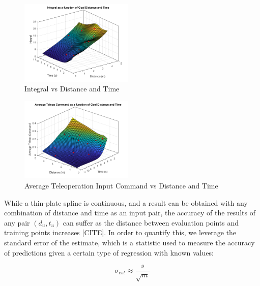 \documentclass[letterpaper, 10 pt, conference]{ieeeconf}  %
\begin{document}
\begin{figure}[ht]
    \includegraphics[width=0.48\textwidth]{images/integs.png}
    \caption{Integral vs Distance and Time}
    \label{fig:integs}
\end{figure}
\begin{figure}[ht]
    \includegraphics[width=0.48\textwidth]{images/joycmds.png}
    \caption{Average Teleoperation Input Command vs Distance and Time}
    \label{fig:joys}
\end{figure}

While a thin-plate spline is continuous, and a result can be obtained with any combination of distance and time as an input pair, the accuracy of the results of any pair $(d_u,t_u)$ can suffer as the distance between evaluation points and training points increases [CITE]. In order to quantify this, we leverage the standard error of the estimate, which is a statistic used to measure the accuracy of predictions given a certain type of regression \cite{stdereg} with known values:

\begin{equation} \label{eq:stderr}
    \sigma_{est} \approx \frac{s}{\sqrt{m}}
\end{equation}
\end{document}

